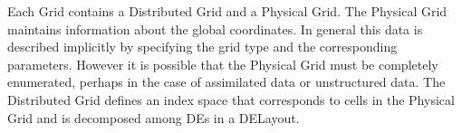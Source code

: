 %


Each Grid contains a Distributed Grid and a Physical Grid. The Physical Grid
maintains information about the global coordinates. In general this data is
described implicitly by specifying the grid type and the corresponding
parameters. However it is possible that the Physical Grid must be completely
enumerated, perhaps in the case of assimilated data or unstructured data. The
Distributed Grid defines an index space that corresponds to cells in the Physical
Grid and is decomposed among DEs in a DELayout.


